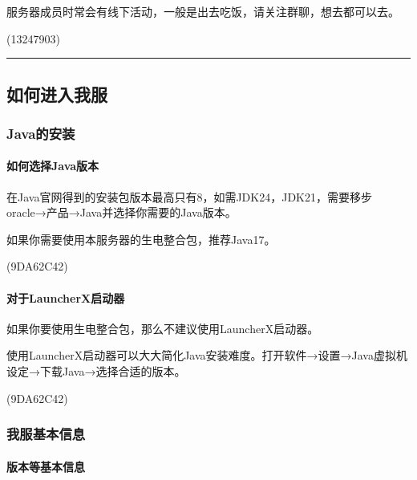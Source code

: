 \documentclass[
]{article}
\begin{document}
服务器成员时常会有线下活动，一般是出去吃饭，请关注群聊，想去都可以去。

\begin{flushright}(13247903)\end{flushright}

\begin{center}\rule{0.5\linewidth}{0.5pt}\end{center}

\subsection{如何进入我服}\label{section-15}

\subsubsection{Java的安装}\label{java}

\paragraph{如何选择Java版本}\label{java-1}

在Java官网得到的安装包版本最高只有8，如需JDK24，JDK21，需要移步oracle→产品→Java并选择你需要的Java版本。

如果你需要使用本服务器的生电整合包，推荐Java17。

\begin{flushright}(9DA62C42)\end{flushright}

\paragraph{对于LauncherX启动器}\label{launcherx}

如果你要使用生电整合包，那么不建议使用LauncherX启动器。

使用LauncherX启动器可以大大简化Java安装难度。打开软件→设置→Java虚拟机设定→下载Java→选择合适的版本。

\begin{flushright}(9DA62C42)\end{flushright}

\subsubsection{我服基本信息}\label{section-16}

\paragraph{版本等基本信息}\label{section-17}
\end{document}
